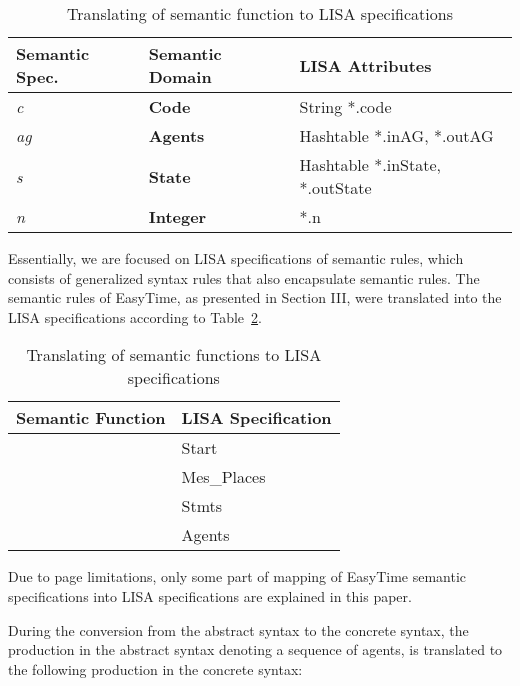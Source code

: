 \documentclass[preprint, prX]{revtex4}
\begin{document}
\begin{table}[htb]
\caption{Translating of semantic function to LISA specifications}
\label{tab:W}
\vspace{-5mm}
\begin{center}
\begin{tabular}{ l l l }
\hline
 Semantic Spec. & Semantic Domain & LISA Attributes \\
\hline
 \textit{c} & \textbf{Code} & String *.code \\
 \textit{ag} & \textbf{Agents} & Hashtable *.inAG, *.outAG \\
 \textit{s} & \textbf{State} & Hashtable *.inState, *.outState \\
 \textit{n} & \textbf{Integer}& *.n  \\
\hline
\end{tabular}
\end{center}
\vspace{-5mm}
\end{table}

Essentially, we are focused on LISA specifications of semantic rules, which consists of generalized syntax rules that also encapsulate
semantic rules. The semantic rules of EasyTime, as presented in Section III, were translated into the LISA specifications according to
Table~\ref{tab:tab2}.

\begin{table}[htb]
\caption{Translating of semantic functions to LISA specifications}
\label{tab:tab2}
\vspace{-5mm}
\begin{center}
\begin{tabular}{ l l }
\hline
 Semantic Function & LISA Specification \\
\hline
  & Start \\
  & Mes\_Places \\
  & Stmts \\
  & Agents \\
\hline
\end{tabular}
\end{center}
\end{table}

Due to page limitations, only some part of mapping of EasyTime semantic specifications into LISA specifications are explained in this
paper.

During the conversion from the abstract syntax to the concrete syntax, the production in the abstract syntax  denoting a sequence of agents, is translated to the following production in the concrete syntax:
\footnotesize
\end{document}
